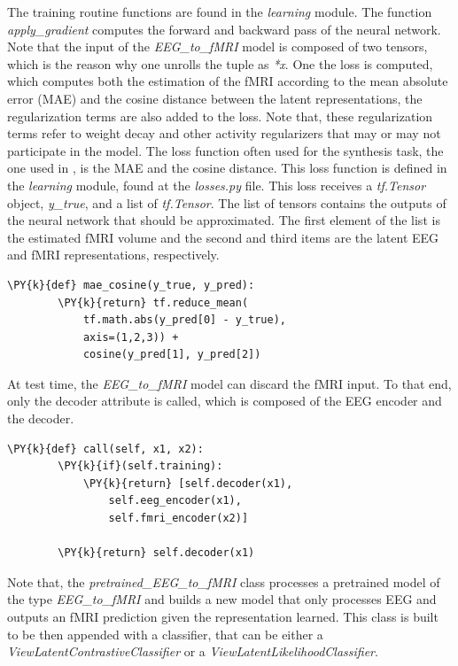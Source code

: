The training routine functions are found in the \textit{learning} module. The function \textit{apply\_gradient} computes the forward and backward pass of the neural network. Note that the input of the \textit{EEG\_to\_fMRI} model is composed of two tensors, which is the reason why one unrolls the tuple as \textit{*x}. One the loss is computed, which computes both the estimation of the fMRI according to the mean absolute error (MAE) and the cosine distance between the latent representations, the regularization terms are also added to the loss. Note that, these regularization terms refer to weight decay and other activity regularizers that may or may not participate in the model. The loss function often used for the synthesis task, the one used in \cite{calhas2022eeg}, is the MAE and the cosine distance. This loss function is defined in the \textit{learning} module, found at the \textit{losses.py} file. This loss receives a \textit{tf.Tensor} object, \textit{y\_true}, and a list of \textit{tf.Tensor}. The list of tensors contains the outputs of the neural network that should be approximated. The first element of the list is the estimated fMRI volume and the second and third items are the latent EEG and fMRI representations, respectively.
\begin{Verbatim}[commandchars=\\\{\},fontsize=\footnotesize]
    \PY{k}{def} mae_cosine(y_true, y_pred):
        \PY{k}{return} tf.reduce_mean(
            tf.math.abs(y_pred[0] - y_true), 
            axis=(1,2,3)) +
            cosine(y_pred[1], y_pred[2])
\end{Verbatim}
At test time, the \textit{EEG\_to\_fMRI} model can discard the fMRI input. To that end, only the decoder attribute is called, which is composed of the EEG encoder and the decoder. 
\begin{Verbatim}[commandchars=\\\{\},fontsize=\footnotesize]
    \PY{k}{def} call(self, x1, x2):
        \PY{k}{if}(self.training):
            \PY{k}{return} [self.decoder(x1), 
                self.eeg_encoder(x1), 
                self.fmri_encoder(x2)]

        \PY{k}{return} self.decoder(x1)
\end{Verbatim}
Note that, the \textit{pretrained\_EEG\_to\_fMRI} class processes a pretrained model of the type \textit{EEG\_to\_fMRI} and builds a new model that only processes EEG and outputs an fMRI prediction given the representation learned. This class is built to be then appended with a classifier, that can be either a \textit{ViewLatentContrastiveClassifier} or a \textit{ViewLatentLikelihoodClassifier}.

